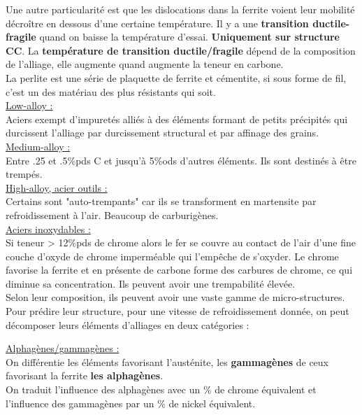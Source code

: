 \documentclass[../main.tex]{subfiles}
\begin{document}
Une autre particularité est que les dislocations dans la ferrite voient leur mobilité décroître en dessous d'une certaine température. Il y a une \textbf{transition ductile-fragile} quand on baisse la température d'essai. \textbf{Uniquement sur structure CC}. La \textbf{température de transition ductile/fragile} dépend de la composition de l'alliage, elle augmente quand augmente la teneur en carbone.\\

La perlite est une série de plaquette de ferrite et cémentite, si sous forme de fil, c'est un des matériau des plus résistants qui soit.\\

\quad \underline{Low-alloy :}\\
Aciers exempt d'impuretés alliés à des éléments formant de petits précipités qui durcissent l'alliage par durcissement structural et par affinage des grains.\\

\quad \underline{Medium-alloy :}\\
Entre .25 et .5$\%$pds C et jusqu'à 5$\%$ods d'autres éléments. Ils sont destinés à être trempés.\\

\quad \underline{High-alloy, acier outils :}\\
Certains sont "auto-trempants" car ils se transforment en martensite par refroidissement à l'air. Beaucoup de carburigènes.\\

\quad \underline{Aciers inoxydables :}\\
Si teneur > 12$\%$pds de chrome alors le fer se couvre au contact de l'air d'une fine couche d'oxyde de chrome imperméable qui l'empêche de s'oxyder. Le chrome favorise la ferrite et en présente de carbone forme des carbures de chrome, ce qui diminue sa concentration. Ils peuvent avoir une trempabilité élevée.\\
Selon leur composition, ils peuvent avoir une vaste gamme de micro-structures. Pour prédire leur structure, pour une vitesse de refroidissement donnée, on peut décomposer leurs éléments d'alliages en deux catégories :

\quad \underline{Alphagènes/gammagènes :}\\
On différentie les éléments favorisant l'austénite, les \textbf{gammagènes} de ceux favorisant la ferrite \textbf{les alphagènes}.\\
On traduit l'influence des alphagènes avec un $\%$ de chrome équivalent et l'influence des gammagènes par un $\%$ de nickel équivalent.\\
\end{document}

